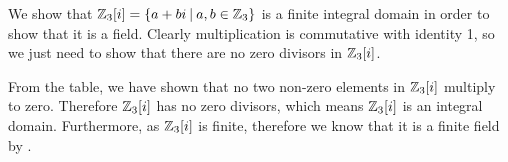 \begin{example}
    We show that $\Zn{3}[i] = \{a+bi \vert a,b \in \Zn{3}\}$ is a finite integral domain in order to show that it is a field. Clearly multiplication is commutative with identity 1, so we just need to show that there are no zero divisors in $\mathbb{Z}_{3}[i]$.
    \begin{table}[h]
        \centering
    \end{table}
    
    From the table, we have shown that no two non-zero elements in $\mathbb{Z}_{3}[i]$ multiply to zero. Therefore $\mathbb{Z}_{3}[i]$ has no zero divisors, which means $\mathbb{Z}_{3}[i]$ is an integral domain. Furthermore, as $\mathbb{Z}_{3}[i]$ is finite, therefore we know that it is a finite field by .
\end{example}

